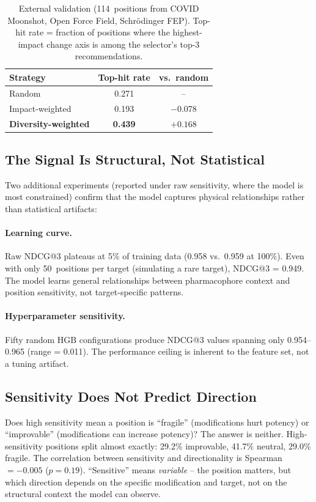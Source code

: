 \documentclass[sigconf, nonacm]{acmart}
\begin{document}
\begin{table}[ht]
\centering
\caption{External validation (114~positions from COVID Moonshot, Open Force Field, Schr\"{o}dinger FEP). Top-hit rate = fraction of positions where the highest-impact change axis is among the selector's top-3 recommendations.}
\label{tab:external}
\small
\begin{tabular}{@{}lcc@{}}
\toprule
Strategy & Top-hit rate & vs.\ random \\
\midrule
Random              & 0.271 & -- \\
Impact-weighted     & 0.193 & $-$0.078 \\
\textbf{Diversity-weighted}  & \textbf{0.439} & $\mathbf{+0.168}$ \\
\bottomrule
\end{tabular}
\end{table}

\subsection{The Signal Is Structural, Not Statistical}

Two additional experiments (reported under raw sensitivity, where the model is most constrained) confirm that the model captures physical relationships rather than statistical artifacts:

\paragraph{Learning curve.} Raw NDCG@3 plateaus at 5\% of training data (0.958 vs.\ 0.959 at 100\%). Even with only 50~positions per target (simulating a rare target), NDCG@3 = 0.949. The model learns general relationships between pharmacophore context and position sensitivity, not target-specific patterns.

\paragraph{Hyperparameter sensitivity.} Fifty random HGB configurations produce NDCG@3 values spanning only 0.954--0.965 (range = 0.011). The performance ceiling is inherent to the feature set, not a tuning artifact.

\subsection{Sensitivity Does Not Predict Direction}

Does high sensitivity mean a position is ``fragile'' (modifications hurt potency) or ``improvable'' (modifications can increase potency)? The answer is neither. High-sensitivity positions split almost exactly: 29.2\% improvable, 41.7\% neutral, 29.0\% fragile. The correlation between sensitivity and directionality is Spearman~$= -0.005$ ($p = 0.19$). ``Sensitive'' means \textit{variable} -- the position matters, but which direction depends on the specific modification and target, not on the structural context the model can observe.
\end{document}
